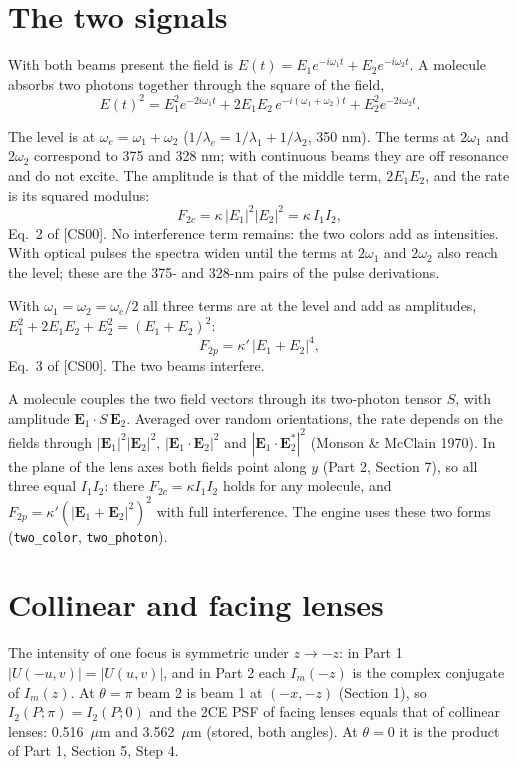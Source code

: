 \documentclass[11pt]{article}
\begin{document}
\section{The two signals}
 With both beams present the field is $E(t) = E_1e^{-i\omega_1t} + E_2e^{-i\omega_2t}$. A molecule absorbs two
photons together through the square of the field,
\begin{equation}E(t)^2 = E_1^2e^{-2i\omega_1t} + 2E_1E_2\,e^{-i(\omega_1+\omega_2)t} + E_2^2e^{-2i\omega_2t} .\end{equation}

 The level is at $\omega_e = \omega_1 + \omega_2$ ($1/\lambda_e = 1/\lambda_1 + 1/\lambda_2$,
350 nm). The terms at $2\omega_1$ and $2\omega_2$ correspond to 375 and 328 nm; with continuous beams they are off
resonance and do not excite. The amplitude is that of the middle term, $2E_1E_2$, and the rate is its squared modulus:
\begin{equation}F_{2c} = \kappa\,|E_1|^2|E_2|^2 = \kappa\,I_1I_2 ,\end{equation}
Eq.~2 of [CS00]. No interference term remains: the two colors add as intensities. With optical pulses the spectra
widen until the terms at $2\omega_1$ and $2\omega_2$ also reach the level; these are the 375- and 328-nm pairs
of the pulse derivations.

 With $\omega_1 = \omega_2 = \omega_e/2$ all three terms are at the level and add as amplitudes,
$E_1^2 + 2E_1E_2 + E_2^2 = (E_1 + E_2)^2$:
\begin{equation}F_{2p} = \kappa'\,|E_1 + E_2|^4 ,\end{equation}
Eq.~3 of [CS00]. The two beams interfere.

 A molecule couples the two field vectors through its two-photon tensor $S$, with amplitude
$\mathbf E_1\cdot S\,\mathbf E_2$. Averaged over random orientations, the rate depends on the fields through
$|\mathbf E_1|^2|\mathbf E_2|^2$, $|\mathbf E_1\cdot\mathbf E_2|^2$ and $|\mathbf E_1\cdot\mathbf E_2^*|^2$ (Monson
\& McClain 1970). In the plane of the lens axes both fields point along $y$ (Part 2, Section 7), so all three equal
$I_1I_2$: there $F_{2c} = \kappa I_1I_2$ holds for any molecule, and $F_{2p} = \kappa'(|\mathbf E_1 + \mathbf E_2|^2)^2$
with full interference. The engine uses these two forms (\texttt{two\_color}, \texttt{two\_photon}).

\section{Collinear and facing lenses}
 The intensity of one focus is symmetric under $z \to -z$: in Part 1 $|U(-u, v)| = |U(u, v)|$, and in
Part 2 each $I_m(-z)$ is the complex conjugate of $I_m(z)$. At $\theta = \pi$ beam 2 is beam 1 at $(-x, -z)$ (Section
1), so $I_2(P; \pi) = I_2(P; 0)$ and the 2CE PSF of facing lenses equals that of collinear lenses: 0.516~$\mu$m and
3.562~$\mu$m (stored, both angles). At $\theta = 0$ it is the product of Part 1, Section 5, Step 4.
\end{document}
